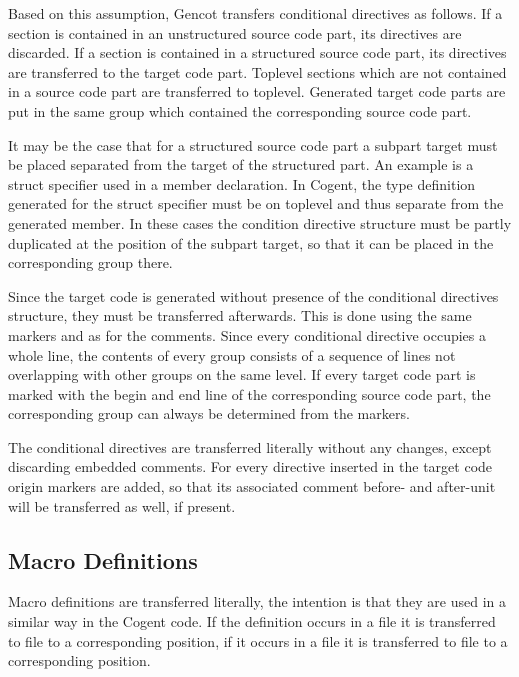 Based on this assumption, Gencot transfers conditional directives as follows. If a section is contained in an 
unstructured source code part, its directives are discarded. If a section is contained in a structured source
code part, its directives are transferred to the target code part. Toplevel sections which are not contained in
a source code part are transferred to toplevel. Generated target code parts are put in the same group which
contained the corresponding source code part.

It may be the case that for a structured source code part a subpart target must be placed separated from the
target of the structured part. An example is a struct specifier used in a member declaration. In Cogent, the 
type definition generated for the struct specifier must be on toplevel and thus separate from the generated member.
In these cases the condition directive structure must be partly duplicated at the position of the subpart target,
so that it can be placed in the corresponding group there.

Since the target code is generated without presence of the conditional directives structure, they must be 
transferred afterwards. This is done using the same markers  and  as for the
comments. Since every conditional directive occupies a whole line, the contents of every group consists of
a sequence of lines not overlapping with other groups on the same level. If every target code part is marked 
with the begin and end line of the corresponding source code part, the corresponding group can always be
determined from the markers.

The conditional directives are transferred literally without any changes, except discarding embedded comments. 
For every directive inserted in the target code origin markers are added, so that its associated comment before-
and after-unit will be transferred as well, if present.

\subsection{Macro Definitions}

Macro definitions are transferred literally, the intention is that they are used in a similar way in the Cogent code.
If the definition occurs in a file  it is transferred to file  to a corresponding position,
if it occurs in a file  it is transferred to file  to a corresponding position.

